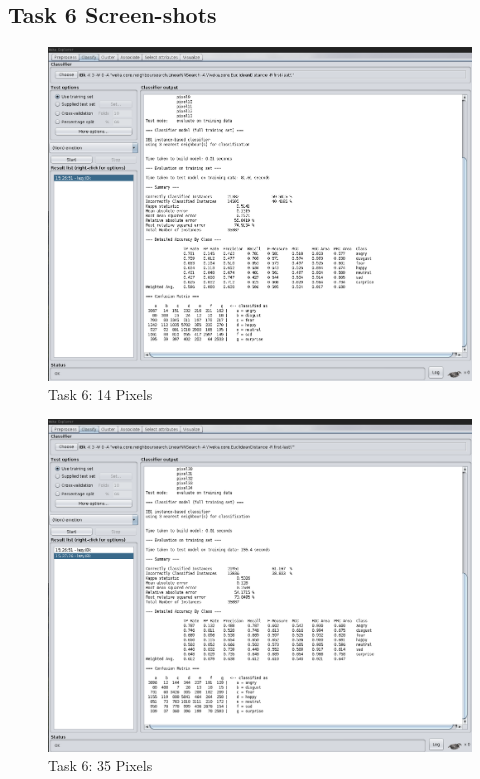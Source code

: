 \documentclass[12pt]{article}
\begin{document}
\subsection{Task 6 Screen-shots}

\begin{figure}[H]
	\centering
	\includegraphics[width=1\linewidth]{images/14_pixels}
	\caption{Task 6: 14 Pixels}
	\label{fig:task6_1}
\end{figure}

\begin{figure}[H]
	\centering
	\includegraphics[width=1\linewidth]{images/35_pixels}
	\caption{Task 6: 35 Pixels}
	\label{fig:task6_2}
\end{figure}
\end{document}
